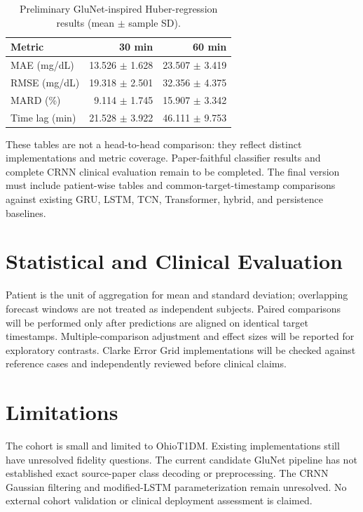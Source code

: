 \documentclass[conference]{IEEEtran}
\begin{document}
\begin{table}[t]
\centering
\caption{Preliminary GluNet-inspired Huber-regression results (mean $\pm$ sample SD).}
\label{tab:glunet-regression}
\begin{tabular}{lrr}
\toprule
Metric & 30 min & 60 min \\
\midrule
MAE (mg/dL) & 13.526 $\pm$ 1.628 & 23.507 $\pm$ 3.419 \\
RMSE (mg/dL) & 19.318 $\pm$ 2.501 & 32.356 $\pm$ 4.375 \\
MARD (\%) & 9.114 $\pm$ 1.745 & 15.907 $\pm$ 3.342 \\
Time lag (min) & 21.528 $\pm$ 3.922 & 46.111 $\pm$ 9.753 \\
\bottomrule
\end{tabular}
\end{table}

These tables are not a head-to-head comparison: they reflect distinct implementations and metric coverage. Paper-faithful classifier results and complete CRNN clinical evaluation remain to be completed. The final version must include patient-wise tables and common-target-timestamp comparisons against existing GRU, LSTM, TCN, Transformer, hybrid, and persistence baselines.

\section{Statistical and Clinical Evaluation}
Patient is the unit of aggregation for mean and standard deviation; overlapping forecast windows are not treated as independent subjects. Paired comparisons will be performed only after predictions are aligned on identical target timestamps. Multiple-comparison adjustment and effect sizes will be reported for exploratory contrasts. Clarke Error Grid implementations will be checked against reference cases and independently reviewed before clinical claims.

\section{Limitations}
The cohort is small and limited to OhioT1DM. Existing implementations still have unresolved fidelity questions. The current candidate GluNet pipeline has not established exact source-paper class decoding or preprocessing. The CRNN Gaussian filtering and modified-LSTM parameterization remain unresolved. No external cohort validation or clinical deployment assessment is claimed.
\end{document}
